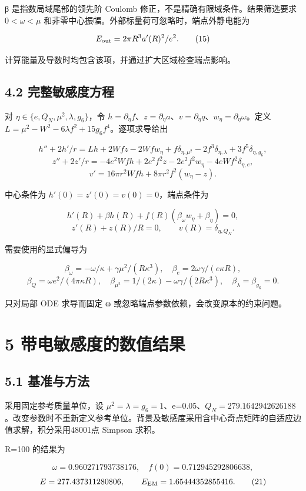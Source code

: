 \documentclass[UTF8,fontset=fandol,11pt]{ctexart}
\begin{document}
β 是指数局域尾部的领先阶 Coulomb 修正，不是精确有限域条件。结果筛选要求 \(0<\omega<\mu\) 和非零中心振幅。外部标量荷可忽略时，端点外静电能为

\[
E_{\rm out}=2\pi R^3a'(R)^2/e^2.
\tag{15}
\]

计算能量及导数时均包含该项，并通过扩大区域检查端点影响。

\subsection*{4.2 完整敏感度方程}

对 \(\eta\in\{e,Q_N,\mu^2,\lambda,g_6\}\)，令
\(h=\partial_\eta f\)、\(z=\partial_\eta a\)、\(v=\partial_\eta q\)、\(w_\eta=\partial_\eta\omega\)。定义
\(L=\mu^2-W^2-6\lambda f^2+15g_6f^4\)。逐项求导给出

\[
h''+2h'/r=Lh+2Wfz-2Wfw_\eta
+f\delta_{\eta,\mu^2}-2f^3\delta_{\eta,\lambda}+3f^5\delta_{\eta,g_6},
\tag{16}
\]
\[
z''+2z'/r=-4e^2Wfh+2e^2f^2z-2e^2f^2w_\eta
-4eWf^2\delta_{\eta,e},
\tag{17}
\]
\[
v'=16\pi r^2Wfh+8\pi r^2f^2(w_\eta-z).
\tag{18}
\]

中心条件为 \(h'(0)=z'(0)=v(0)=0\)，端点条件为

\[
h'(R)+\beta h(R)+f(R)(\beta_\omega w_\eta+\beta_\eta)=0,
\]
\[
z'(R)+z(R)/R=0,\qquad v(R)=\delta_{\eta,Q_N}.
\tag{19}
\]

需要使用的显式偏导为

\[
\beta_\omega=-\omega/\kappa+\gamma\mu^2/(R\kappa^3),
\quad\beta_e=2\omega\gamma/(e\kappa R),
\]
\[
\beta_Q=\omega e^2/(4\pi\kappa R),
\quad\beta_{\mu^2}=1/(2\kappa)-\omega\gamma/(2R\kappa^3),
\quad\beta_\lambda=\beta_{g_6}=0.
\tag{20}
\]

只对局部 ODE 求导而固定 ω 或忽略端点参数依赖，会改变原本的约束问题。

\section*{5 带电敏感度的数值结果}

\subsection*{5.1 基准与方法}

采用固定参考质量单位，设 \(\mu^2=\lambda=g_6=1\)、e=0.05、\(Q_N=279.1642942626188\)。改变参数时不重新定义参考单位。背景及敏感度采用含中心奇点矩阵的自适应边值求解，积分采用48001点 Simpson 求积。

R=100 的结果为

\[
\omega=0.960271793738176,\quad f(0)=0.712945292806638,
\]
\[
E=277.437311280806,\qquad E_{\rm EM}=1.65444352855416.
\tag{21}
\]
\end{document}
